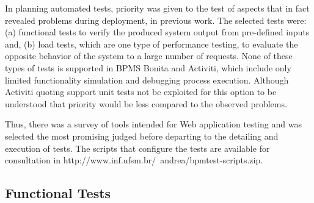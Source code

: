 \documentclass[runningheads,a4paper]{llncs}
\begin{document}
In planning automated tests, priority was given to the test of aspects that in fact revealed problems during deployment, in previous work. The selected tests were: (a) functional tests to verify the produced system output from pre-defined inputs and, (b) load tests, which are one type of performance testing, to evaluate the opposite behavior of the system to a large number of requests. None of these types of tests is supported in BPMS Bonita and Activiti, which include only limited functionality simulation and debugging process execution. Although Activiti quoting support unit tests not be exploited for this option to be understood that priority would be less compared to the observed problems.

Thus, there was a survey of tools intended for Web application testing and was selected the most promising judged before departing to the detailing and execution of tests. The scripts that configure the tests are available for consultation in http://www.inf.ufsm.br/~andrea/bpmtest-scripts.zip.


\subsection{Functional Tests}

\end{document}
